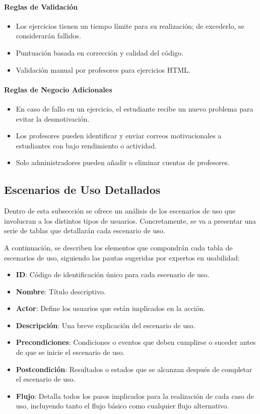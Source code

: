 \paragraph{Reglas de Validación}
\begin{itemize}
    \item Los ejercicios tienen un tiempo límite para su realización; de excederlo, se considerarán fallidos.
    \item Puntuación basada en corrección y calidad del código.
    \item Validación manual por profesores para ejercicios HTML.
\end{itemize}

\paragraph{Reglas de Negocio Adicionales}
\begin{itemize}
    \item En caso de fallo en un ejercicio, el estudiante recibe un nuevo problema para evitar la desmotivación.
    \item Los profesores pueden identificar y enviar correos motivacionales a estudiantes con bajo rendimiento o actividad.
    \item Solo administradores pueden añadir o eliminar cuentas de profesores.
\end{itemize}

\subsection{Escenarios de Uso Detallados}

Dentro de esta subsección se ofrece un análisis de los escenarios de uso que involucran a los distintos tipos de usuarios. Concretamente, se va a presentar una serie de tablas que detallarán cada escenario de uso.

A continuación, se describen los elementos que compondrán cada tabla de escenarios de uso, siguiendo las pautas sugeridas por expertos en usabilidad:

\begin{itemize}
    \item \textbf{ID}: Código de identificación único para cada escenario de uso.
    \item \textbf{Nombre}: Título descriptivo.
    \item \textbf{Actor}: Define los usuarios que están implicados en la acción.
    \item \textbf{Descripción}: Una breve explicación del escenario de uso. 
    \item \textbf{Precondiciones}: Condiciones o eventos que deben cumplirse o suceder antes de que se inicie el escenario de uso.
    \item \textbf{Postcondición}: Resultados o estados que se alcanzan después de completar el escenario de uso.
    \item \textbf{Flujo}: Detalla todos los pasos implicados para la realización de cada caso de uso, incluyendo tanto el flujo básico como cualquier flujo alternativo.
\end{itemize}

